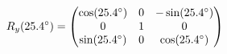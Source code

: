 \documentclass[preview]{standalone}
\begin{document}
\begin{align*}
\special{dvisvgm:raw <g id='unique000'>}R_y(25.4^\circ) = \begin{pmatrix} \cos(25.4^\circ) & 0 & -\sin(25.4^\circ) \\ 0 & 1 & 0 \\ \sin(25.4^\circ) & 0 & \cos(25.4^\circ) \end{pmatrix}\special{dvisvgm:raw </g>}
\end{align*}
\end{document}
